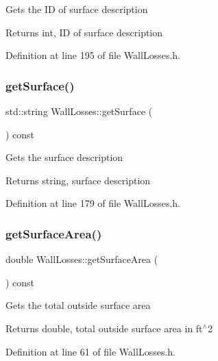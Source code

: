 Gets the ID of surface description \begin{DoxyReturn}{Returns}
int, ID of surface description 
\end{DoxyReturn}


Definition at line 195 of file Wall\+Losses.\+h.

\mbox{\label{class_wall_losses_a10f5de20dc6fead726adbf62a9c49b09}} 
\subsubsection{\texorpdfstring{get\+Surface()}{getSurface()}}
{\footnotesize\ttfamily std\+::string Wall\+Losses\+::get\+Surface (\begin{DoxyParamCaption}{ }\end{DoxyParamCaption}) const\hspace{0.3cm}{\ttfamily [inline]}}

Gets the surface description \begin{DoxyReturn}{Returns}
string, surface description 
\end{DoxyReturn}


Definition at line 179 of file Wall\+Losses.\+h.

\mbox{\label{class_wall_losses_ad4d3aa549cc7ab19e927823dbafed973}} 
\subsubsection{\texorpdfstring{get\+Surface\+Area()}{getSurfaceArea()}}
{\footnotesize\ttfamily double Wall\+Losses\+::get\+Surface\+Area (\begin{DoxyParamCaption}{ }\end{DoxyParamCaption}) const\hspace{0.3cm}{\ttfamily [inline]}}

Gets the total outside surface area \begin{DoxyReturn}{Returns}
double, total outside surface area in ft$^\wedge$2 
\end{DoxyReturn}


Definition at line 61 of file Wall\+Losses.\+h.

